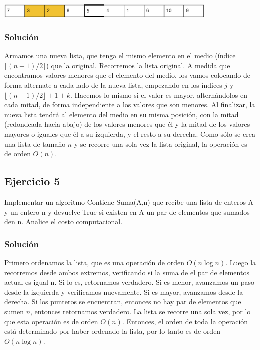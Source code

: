 \documentclass{article}
\begin{document}
\includegraphics[width=400px]{./img/ejemploEjercicio4.png}

\subsubsection*{Solución}
Armamos una nueva lista, que tenga el mismo elemento en el medio (índice $\lfloor (n - 1) / 2 \rfloor$) que la original. Recorremos la lista original. A medida que encontramos valores menores que el elemento del medio, los vamos colocando de forma alternate a cada lado de la nueva lista, empezando en los índices $j$ y $\lfloor (n - 1)/2 \rfloor + 1 + k$. Hacemos lo mismo si el valor es mayor, alternándolos en cada mitad, de forma independiente a los valores que son menores. Al finalizar, la nueva lista tendrá al elemento del medio en su misma posición, con la mitad (redondeada hacia abajo) de los valores menores que él y la mitad de los valores mayores o iguales que él a su izquierda, y el resto a su derecha. Como sólo se crea una lista de tamaño $n$ y se recorre una sola vez la lista original, la operación es de orden $O(n)$.



\subsection*{Ejercicio 5}
Implementar un algoritmo Contiene-Suma(A,n) que recibe una lista de enteros A y un entero n y devuelve True si existen en A un par de elementos que sumados den n. Analice el costo computacional.

\subsubsection*{Solución}

Primero ordenamos la lista, que es una operación de orden $O(n \log n)$. Luego la recorremos desde ambos extremos, verificando si la suma de el par de elementos actual es igual n. Si lo es, retornamos verdadero. Si es menor, avanzamos un paso desde la izquierda y verificamos nuevamente. Si es mayor, avanzamos desde la derecha. Si los punteros se encuentran, entonces no hay par de elementos que sumen $n$, entonces retornamos verdadero. La lista se recorre una sola vez, por lo que esta operación es de orden $O(n)$. Entonces, el orden de toda la operación está determinado por haber ordenado la lista, por lo tanto es de orden $O(n \log n)$.
\end{document}

